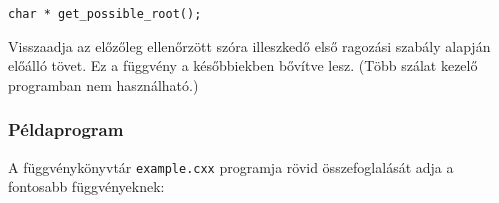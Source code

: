 \noindent\verb+char * get_possible_root();+

Visszaadja az előzőleg ellenőrzött szóra illeszkedő
első ragozási szabály alapján előálló tövet.
Ez a függvény a későbbiekben bővítve lesz.
(Több szálat kezelő programban nem használható.)

\subsubsection{Példaprogram}

A függvénykönyvtár \texttt{example.cxx} programja rövid összefoglalását
adja a fontosabb függvényeknek:


